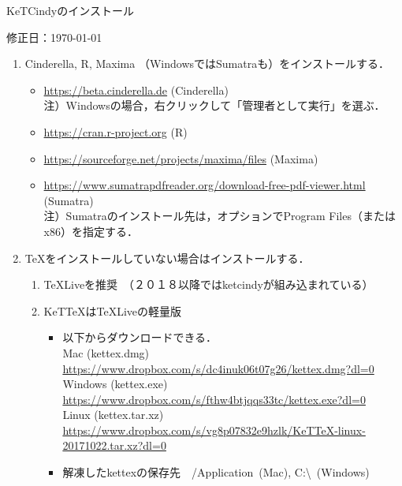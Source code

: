 \documentclass{ujarticle}
\begin{document}
\begin{center}
KeTCindyのインストール
\end{center}

\vspace{-5mm}

\hfill 修正日：\today

\begin{enumerate}[\bf\large 1.]
\item Cinderella, R, Maxima （WindowsではSumatraも）をインストールする．

 \begin{itemize}
 \item \url{https://beta.cinderella.de}  (Cinderella)\\
\hspace*{6mm}注）Windowsの場合，右クリックして「管理者として実行」を選ぶ．
 \item \url{https://cran.r-project.org}   (R)
 \item \url{https://sourceforge.net/projects/maxima/files}  (Maxima)
 \item \url{https://www.sumatrapdfreader.org/download-free-pdf-viewer.html} (Sumatra)\\
\hspace*{6mm}注）Sumatraのインストール先は，オプションでProgram Files（またはx86）を指定する．

 \end{itemize}
\item TeXをインストールしていない場合はインストールする．
 \begin{enumerate}[(1)]
 \item TeXLiveを推奨　（２０１８以降ではketcindyが組み込まれている）
 \item KeTTeXはTeXLiveの軽量版
    \begin{itemize}
    \item 以下からダウンロードできる．\\
    \hspace*{5mm}Mac (kettex.dmg)\\
    \hspace*{10mm}\url{https://www.dropbox.com/s/dc4inuk06t07g26/kettex.dmg?dl=0}\\
    \hspace*{5mm}Windows (kettex.exe)\\
    \hspace*{10mm}\url{https://www.dropbox.com/s/fthw4btjqqs33tc/kettex.exe?dl=0}\\
    \hspace*{5mm}Linux (kettex.tar.xz)\\
    \hspace*{10mm}\url{https://www.dropbox.com/s/vg8p07832e9hzlk/KeTTeX-linux-20171022.tar.xz?dl=0}
     \item 解凍したkettexの保存先　/Application\ (Mac), C:\textbackslash\ (Windows)\end{itemize}
 \end{enumerate}


\end{enumerate}
\end{document}
